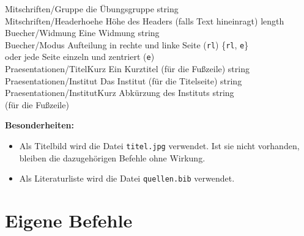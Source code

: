 \begin{tabbing}
				Mitschriften/Gruppe 			\> \zb die Übungsgruppe					\> string			\\
				Mitschriften/Headerhoehe		\> Höhe des Headers (falls Text hineinragt)
																						\> length			\\
				Buecher/Widmung					\> Eine Widmung							\> string			\\
				Buecher/Modus					\> Aufteilung in rechte und linke Seite (\texttt{rl})
																						\> \{\texttt{rl}, \texttt{e}\} \\
												\> oder jede Seite einzeln und zentriert (\texttt{e})					\\
				Praesentationen/TitelKurz		\> Ein Kurztitel (für die Fußzeile)		\> string			\\
				Praesentationen/Institut		\> Das Institut (für die Titelseite)	\> string			\\
				Praesentationen/InstitutKurz	\> Abkürzung des Instituts 				\> string 			\\
												\> (für die Fußzeile)
			\end{tabbing}
			\textbf{Besonderheiten:}
			\begin{itemize}
				\item Als Titelbild wird die Datei \texttt{titel.jpg} verwendet. Ist sie nicht vorhanden, bleiben die dazugehörigen Befehle ohne Wirkung.
				\item Als Literaturliste wird die Datei \texttt{quellen.bib} verwendet.
			\end{itemize}


	

	\chapter{Eigene Befehle}
